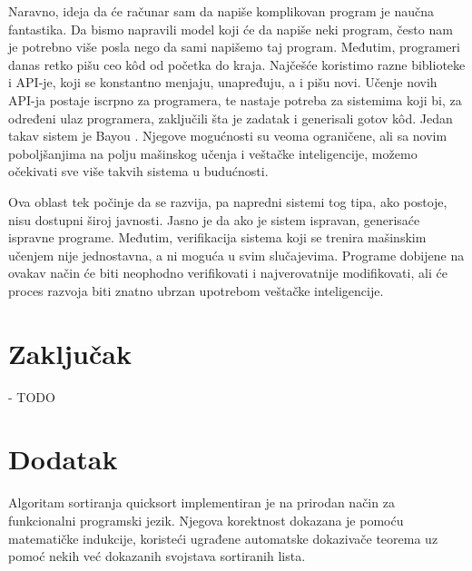 \documentclass[a4paper]{article}
\begin{document}
Naravno, ideja da će računar sam da napiše komplikovan program je naučna fantastika. Da bismo napravili model koji će da napiše neki program, često nam je potrebno više posla nego da sami napišemo taj program. Međutim, programeri danas retko pišu ceo k\^{o}d od početka do kraja. Najčešće koristimo razne biblioteke i API-je, koji se konstantno menjaju, unapređuju, a i pišu novi. Učenje novih API-ja postaje iscrpno za programera, te nastaje potreba za sistemima koji bi, za određeni ulaz programera, zaključili šta je zadatak i generisali gotov k\^{o}d. Jedan takav sistem je Bayou \cite{bayou}. Njegove mogućnosti su veoma ograničene, ali sa novim poboljšanjima na polju mašinskog učenja i veštačke inteligencije, možemo očekivati sve više takvih sistema u budućnosti.

Ova oblast tek počinje da se razvija, pa napredni sistemi tog tipa, ako postoje, nisu dostupni široj javnosti. Jasno je da ako je sistem ispravan, generisaće ispravne programe. Međutim, verifikacija sistema koji se trenira mašinskim učenjem nije jednostavna, a ni moguća u svim slučajevima. Programe dobijene na ovakav način će biti neophodno verifikovati i najverovatnije modifikovati, ali će proces razvoja biti znatno ubrzan upotrebom veštačke inteligencije. 

\section{Zaključak}
\label{sec:zakljucak}

- TODO \\

\appendix
 


\clearpage

\appendix
\section{Dodatak}
\label{sec:dodatak}
Algoritam sortiranja quicksort implementiran je na prirodan način za funkcionalni programski jezik.
Njegova korektnost dokazana je pomoću matematičke indukcije, koristeći ugrađene automatske dokazivače teorema uz pomoć nekih već dokazanih svojstava sortiranih lista.
\end{document}
